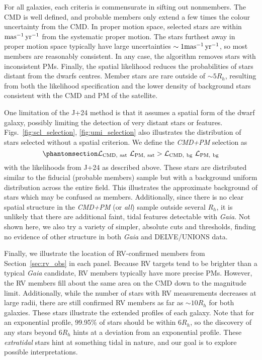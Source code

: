 For all galaxies, each criteria is commensurate in sifting out
nonmembers. The CMD is well defined, and probable members only extend a
few times the colour uncertainty from the CMD. In proper motion space,
selected stars are within \({\rm mas^{-1}\,yr^{-1}}\) from the systematic proper motion.
The stars furthest away in proper motion space typically have large
uncertainties \(\sim 1{\rm mas^{-1}\,yr^{-1}}\), so most members are reasonably
consistent. In any case, the algorithm removes stars with inconsistent
PMs. Finally, the spatial likelihood reduces the probabilities of stars
distant from the dwarfs centres. Member stars are rare outside of
\(\sim5R_h\), resulting from both the likelihood specification and the
lower density of background stars consistent with the CMD and PM of the
satellite.

One limitation of the J+24 method is that it assumes a spatial form of
the dwarf galaxy, possibly limiting the detection of very distant stars
or features. Figs.~\ref{fig:scl_selection}, \ref{fig:umi_selection} also
illustrates the distribution of stars selected without a spatial
criterion. We define the \emph{CMD+PM} selection as
\begin{equation}\protect\phantomsection\label{eq:sel_cmd_pm}{
{\cal L}_{\rm CMD,\ sat}\ {\cal L}_{\rm PM,\ sat} > {\cal L}_{\rm CMD,\ bg}\ {\cal L}_{\rm PM,\ bg}
}\end{equation} with the likelihoods from J+24 as described above. These
stars are distributed similar to the fiducial (probable members) sample
but with a background uniform distribution across the entire field. This
illustrates the approximate background of stars which may be confused as
members. Additionally, since there is no clear spatial structure in the
\emph{CMD+PM} (or \emph{all}) sample outside several \(R_h\), it is
unlikely that there are additional faint, tidal features detectable with
\emph{Gaia}. Not shown here, we also try a variety of simpler, absolute
cuts and thresholds, finding no evidence of other structure in both
\emph{Gaia} and DELVE/UNIONS data.

Finally, we illustrate the location of RV-confirmed members from
Section~\ref{sec:rv_obs} in each panel. Because RV targets tend to be
brighter than a typical \emph{Gaia} candidate, RV members typically have
more precise PMs. However, the RV members fill about the same area on
the CMD down to the magnitude limit. Additionally, while the number of
stars with RV measurements decreases at large radii, there are still
confirmed RV members as far as \(\sim 10R_h\) for both galaxies. These
stars illustrate the extended profiles of each galaxy. Note that for an
exponential profile, 99.95\% of stars should be within \(6R_h\), so the
discovery of any stars beyond \(6R_h\) hints at a deviation from an
exponential profile. These \emph{extratidal} stars hint at something
tidal in nature, and our goal is to explore possible interpretations.

